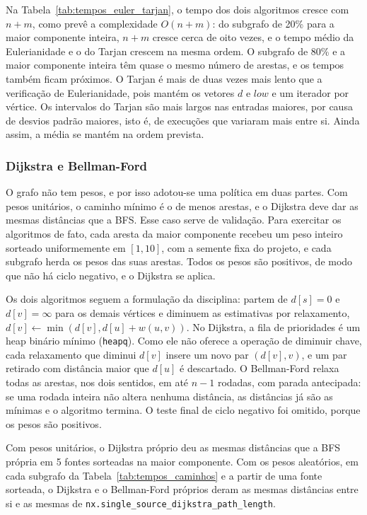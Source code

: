 Na Tabela~\ref{tab:tempos_euler_tarjan}, o tempo dos dois algoritmos cresce com $n + m$, como prevê a complexidade $O(n + m)$: do subgrafo de 20\% para a maior componente inteira, $n + m$ cresce cerca de oito vezes, e o tempo médio da Eulerianidade e o do Tarjan crescem na mesma ordem. O subgrafo de 80\% e a maior componente inteira têm quase o mesmo número de arestas, e os tempos também ficam próximos. O Tarjan é mais de duas vezes mais lento que a verificação de Eulerianidade, pois mantém os vetores $d$ e $low$ e um iterador por vértice. Os intervalos do Tarjan são mais largos nas entradas maiores, por causa de desvios padrão maiores, isto é, de execuções que variaram mais entre si. Ainda assim, a média se mantém na ordem prevista.

\subsubsection{Dijkstra e Bellman-Ford}

O grafo não tem pesos, e por isso adotou-se uma política em duas partes. Com pesos unitários, o caminho mínimo é o de menos arestas, e o Dijkstra deve dar as mesmas distâncias que a BFS. Esse caso serve de validação. Para exercitar os algoritmos de fato, cada aresta da maior componente recebeu um peso inteiro sorteado uniformemente em $[1, 10]$, com a semente fixa do projeto, e cada subgrafo herda os pesos das suas arestas. Todos os pesos são positivos, de modo que não há ciclo negativo, e o Dijkstra se aplica.

Os dois algoritmos seguem a formulação da disciplina: partem de $d[s] = 0$ e $d[v] = \infty$ para os demais vértices e diminuem as estimativas por relaxamento, $d[v] \gets \min(d[v], d[u] + w(u, v))$. No Dijkstra, a fila de prioridades é um heap binário mínimo (\texttt{heapq}). Como ele não oferece a operação de diminuir chave, cada relaxamento que diminui $d[v]$ insere um novo par $(d[v], v)$, e um par retirado com distância maior que $d[u]$ é descartado. O Bellman-Ford relaxa todas as arestas, nos dois sentidos, em até $n - 1$ rodadas, com parada antecipada: se uma rodada inteira não altera nenhuma distância, as distâncias já são as mínimas e o algoritmo termina. O teste final de ciclo negativo foi omitido, porque os pesos são positivos.

Com pesos unitários, o Dijkstra próprio deu as mesmas distâncias que a BFS própria em 5 fontes sorteadas na maior componente. Com os pesos aleatórios, em cada subgrafo da Tabela~\ref{tab:tempos_caminhos} e a partir de uma fonte sorteada, o Dijkstra e o Bellman-Ford próprios deram as mesmas distâncias entre si e as mesmas de \texttt{nx.single\_source\_dijkstra\_path\_length}.

